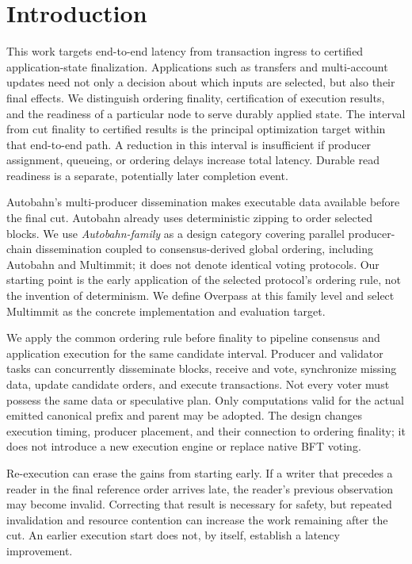 \section{Introduction}
\label{sec:introduction}

This work targets end-to-end latency from transaction ingress to certified application-state finalization. Applications such as transfers and multi-account updates need not only a decision about which inputs are selected, but also their final effects. We distinguish ordering finality, certification of execution results, and the readiness of a particular node to serve durably applied state. The interval from cut finality to certified results is the principal optimization target within that end-to-end path. A reduction in this interval is insufficient if producer assignment, queueing, or ordering delays increase total latency. Durable read readiness is a separate, potentially later completion event.

Autobahn's multi-producer dissemination makes executable data available before the final cut. Autobahn already uses deterministic zipping to order selected blocks. We use \emph{Autobahn-family} as a design category covering parallel producer-chain dissemination coupled to consensus-derived global ordering, including Autobahn and Multimmit; it does not denote identical voting protocols. Our starting point is the early application of the selected protocol's ordering rule, not the invention of determinism. We define Overpass at this family level and select Multimmit as the concrete implementation and evaluation target. \citep{autobahn,multimmit}

We apply the common ordering rule before finality to pipeline consensus and application execution for the same candidate interval. Producer and validator tasks can concurrently disseminate blocks, receive and vote, synchronize missing data, update candidate orders, and execute transactions. Not every voter must possess the same data or speculative plan. Only computations valid for the actual emitted canonical prefix and parent may be adopted. The design changes execution timing, producer placement, and their connection to ordering finality; it does not introduce a new execution engine or replace native BFT voting.

Re-execution can erase the gains from starting early. If a writer that precedes a reader in the final reference order arrives late, the reader's previous observation may become invalid. Correcting that result is necessary for safety, but repeated invalidation and resource contention can increase the work remaining after the cut. An earlier execution start does not, by itself, establish a latency improvement.


